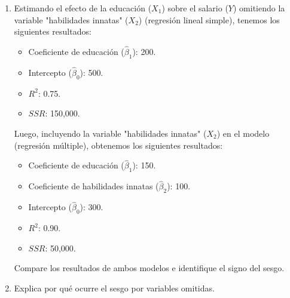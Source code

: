 \documentclass[10pt,a4paper]{article}
\begin{document}
\begin{enumerate}
    \item Estimando el efecto de la educación (\( X_1 \)) sobre el salario (\( Y \)) omitiendo la variable "habilidades innatas" (\( X_2 \)) (regresión lineal simple), tenemos los siguientes resultados:
    \begin{itemize}
    \item Coeficiente de educación (\( \hat{\beta}_1 \)): 200.
    \item Intercepto (\( \hat{\beta}_0 \)): 500.
    \item \( R^2 \): 0.75.
    \item \( SSR \): 150,000.
    \end{itemize}
    Luego, incluyendo la variable "habilidades innatas" (\( X_2 \)) en el modelo (regresión múltiple), obtenemos los siguientes resultados:
    \begin{itemize}
    \item Coeficiente de educación (\( \hat{\beta}_1 \)): 150.
    \item Coeficiente de habilidades innatas (\( \hat{\beta}_2 \)): 100.
    \item Intercepto (\( \hat{\beta}_0 \)): 300.
    \item \( R^2 \): 0.90.
    \item \( SSR \): 50,000.
\end{itemize}
Compare los resultados de ambos modelos e identifique el signo del sesgo.

    \item Explica por qué ocurre el sesgo por variables omitidas.
\end{enumerate}



    
\end{document}
